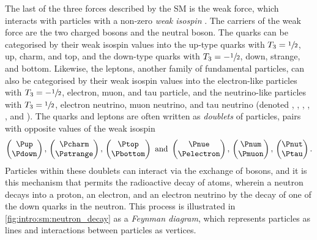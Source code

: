 The last of the three forces described by the \ac{SM} is the weak force, which 
interacts with particles with a non-zero \emph{weak isospin} \wisospin.
The carriers of the weak force are the two charged \PWpm bosons and the neutral 
\PZ boson.
The quarks can be categorised by their weak isospin values into the up-type 
quarks with $T_{3} = \sfrac{1}{2}$, up, charm, and top, and the down-type 
quarks with $T_{3} = -\sfrac{1}{2}$, down, strange, and bottom.
Likewise, the leptons, another family of fundamental particles, can also be 
categorised by their weak isospin values into the electron-like particles with 
$T_{3} = -\sfrac{1}{2}$, electron, muon, and tau particle, and the 
neutrino-like particles with $T_{3} = \sfrac{1}{2}$, electron neutrino, 
muon neutrino, and tau neutrino (denoted \Pelectron, \Pmuon, \Ptau, \Pnue, 
\Pnum, and \Pnut).
The quarks and leptons are often written as \emph{doublets} of particles, pairs 
with opposite values of the weak isospin
\begin{equation}
  \begin{pmatrix}\Pup\\\Pdown\end{pmatrix},\,
  \begin{pmatrix}\Pcharm\\\Pstrange\end{pmatrix},\,
  \begin{pmatrix}\Ptop\\\Pbottom\end{pmatrix}
  \text{\ and\ }
  \begin{pmatrix}\Pnue\\\Pelectron\end{pmatrix},\,
  \begin{pmatrix}\Pnum\\\Pmuon\end{pmatrix},\,
  \begin{pmatrix}\Pnut\\\Ptau\end{pmatrix}.
  \label{intro:sm:weak_doublets}
\end{equation}
Particles within these doublets can interact via the exchange of \PWpm bosons, 
and it is this mechanism that permits the radioactive decay of atoms, wherein a 
neutron decays into a proton, an electron, and an electron neutrino by the 
decay of one of the down quarks in the neutron.
This process is illustrated in \cref{fig:intro:sm:neutron_decay} as a 
\emph{Feynman diagram}, which represents particles as lines and interactions 
between particles as vertices.

